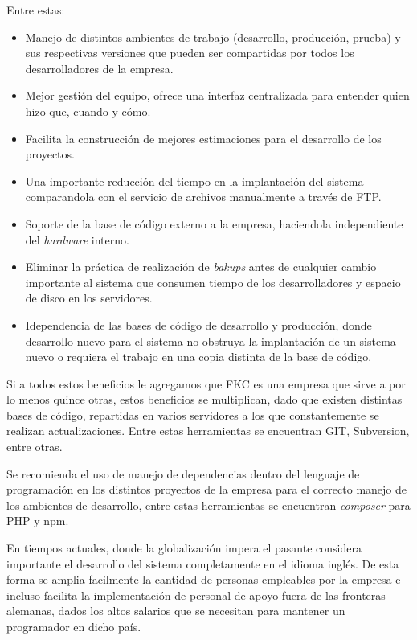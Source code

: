 Entre estas:

\begin{itemize}
	\item Manejo de distintos ambientes de trabajo (desarrollo, producción, prueba) y sus respectivas versiones que pueden ser compartidas por todos los desarrolladores de la empresa.
	
	\item Mejor gestión del equipo, ofrece una interfaz centralizada para entender quien hizo que, cuando y cómo.

	\item Facilita la construcción de mejores estimaciones para el desarrollo de los proyectos.

	\item Una importante reducción del tiempo en la implantación del sistema comparandola con el servicio de archivos manualmente a través de FTP.

	\item Soporte de la base de código externo a la empresa, haciendola independiente del \emph{hardware} interno.

	\item Eliminar la práctica de realización de \emph{bakups} antes de cualquier cambio importante al sistema que consumen tiempo de los desarrolladores y espacio de disco en los servidores.

	\item Idependencia de las bases de código de desarrollo y producción, donde desarrollo nuevo para el sistema no obstruya la implantación de un sistema nuevo o requiera el trabajo en una copia distinta de la base de código.
\end{itemize}

Si a todos estos beneficios le agregamos que FKC es una empresa que sirve a por lo menos quince otras, estos beneficios se multiplican, dado que existen distintas bases de código, repartidas en varios servidores a los que constantemente se realizan actualizaciones. Entre estas herramientas se encuentran GIT, Subversion, entre otras.

Se recomienda el uso de manejo de dependencias dentro del lenguaje de programación en los distintos proyectos de la empresa para el correcto manejo de los ambientes de desarrollo, entre estas herramientas se encuentran \emph{composer} para PHP y npm. 

En tiempos actuales, donde la globalización impera el pasante considera importante el desarrollo del sistema completamente en el idioma inglés. De esta forma se amplia facilmente la cantidad de personas empleables por la empresa e incluso facilita la implementación de personal de apoyo fuera de las fronteras alemanas, dados los altos salarios que se necesitan para mantener un programador en dicho país.

